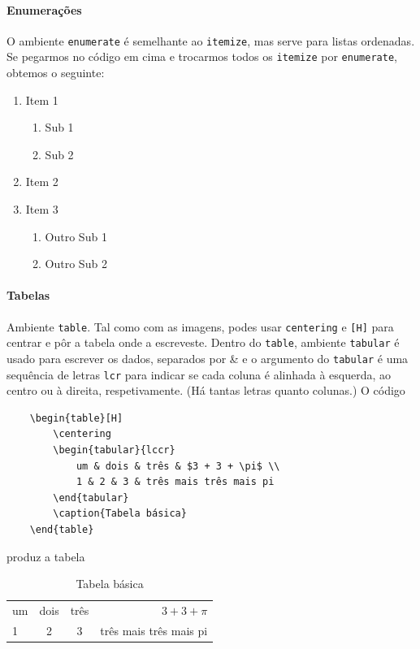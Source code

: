 \documentclass[11pt]{article}
\begin{document}
\paragraph{Enumerações}
O ambiente \texttt{enumerate} é semelhante ao \texttt{itemize},
mas serve para listas ordenadas.
Se pegarmos no código em cima e trocarmos todos os \texttt{itemize}
por \texttt{enumerate}, obtemos o seguinte:

\begin{enumerate}
    \item Item 1 \begin{enumerate}
        \item Sub 1
        \item Sub 2
    \end{enumerate}
    \item Item 2
    \item Item 3 \begin{enumerate}
        \item Outro Sub 1
        \item Outro Sub 2
    \end{enumerate}
\end{enumerate}

\paragraph{Tabelas}
Ambiente \texttt{table}.
Tal como com as imagens, podes usar \texttt{centering} e
\texttt{[H]} para centrar e pôr a tabela onde a escreveste.
Dentro do \texttt{table}, ambiente \texttt{tabular} é usado para escrever os
dados, separados por \& e o argumento do \texttt{tabular} é uma sequência de letras
\texttt{lcr} para indicar se cada coluna é alinhada à esquerda, ao centro ou à
direita, respetivamente. (Há tantas letras quanto colunas.)
O código
\begin{verbatim}
    \begin{table}[H]
        \centering
        \begin{tabular}{lccr}
            um & dois & três & $3 + 3 + \pi$ \\
            1 & 2 & 3 & três mais três mais pi
        \end{tabular}
        \caption{Tabela básica}
    \end{table}
\end{verbatim}
produz a tabela
\begin{table}[H]
    \centering
    \begin{tabular}{lccr}
        um & dois & três & $3 + 3 + \pi$ \\
        1 & 2 & 3 & três mais três mais pi
    \end{tabular}
    \caption{Tabela básica}
\end{table}
\end{document}

